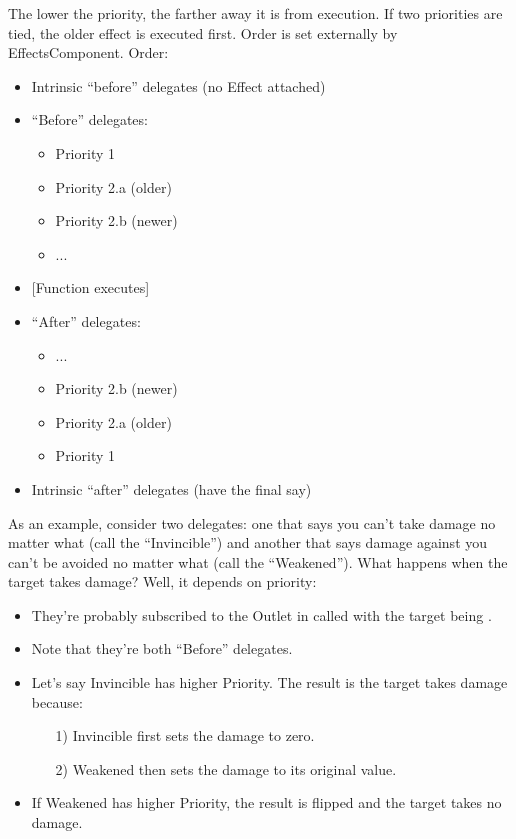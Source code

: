\begin{enumerate}
{\begin{itemize}
{\begin{tcolorbox}[colback=gray!20!white,colframe=blue!75!black,title=Priorities]
				The lower the priority, the farther away it is from execution. If two priorities are tied, the older effect is executed first. Order is set externally by EffectsComponent. Order:\\
				\begin{itemize}
					\item{Intrinsic ``before'' delegates (no Effect attached)}
					\item{``Before'' delegates:
						\begin{itemize}
							\item{Priority 1}
							\item{Priority 2.a (older)}
							\item{Priority 2.b (newer)}
							\item{...}
						\end{itemize}
						}
					\item{[Function executes]}
					\item{``After'' delegates:
						\begin{itemize}
							\item{...}
							\item{Priority 2.b (newer)}
							\item{Priority 2.a (older)}
							\item{Priority 1}
						\end{itemize}
						}
					\item{Intrinsic ``after'' delegates (have the final say)}
				\end{itemize}
				
			As an example, consider two delegates: one that says you can't take damage no matter what (call the  ``Invincible'') and another that says damage against you can't be avoided no matter what (call the  ``Weakened''). What happens when the target takes damage? Well, it depends on priority:
			\begin{itemize}
				\item{They're probably subscribed to the Outlet in  called  with the target  being .}
				\item{Note that they're both ``Before'' delegates.}
				\item{Let's say Invincible has higher Priority. The result is the target takes damage because:
					\begin{enumerate}
						\item[1)]{Invincible first sets the damage to zero.}
						\item[2)]{Weakened then sets the damage to its original value.}
					\end{enumerate}
				}
				\item{If Weakened has higher Priority, the result is flipped and the target takes no damage.}
			\end{itemize}
	 

\end{tcolorbox}}
\end{itemize}}
\end{enumerate}
